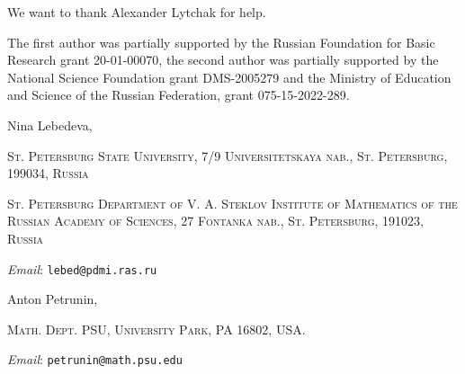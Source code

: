 \documentclass{article}
\makeatletter
\newcommand{\Addresses}{{\bigskip\footnotesize

\noindent Nina Lebedeva,
\par\nopagebreak
 \textsc{St. Petersburg State University, 7/9 Universitetskaya nab., St. Petersburg, 199034, Russia}
\par
\nopagebreak
 \textsc{St. Petersburg Department of V. A. Steklov Institute of Mathematics of the Russian Academy of Sciences, 27 Fontanka nab., St. Petersburg, 191023, Russia}
  \par\nopagebreak
  \textit{Email}: \texttt{lebed@pdmi.ras.ru}

\medskip

\noindent   Anton Petrunin, 
\par\nopagebreak
 \textsc{Math. Dept. PSU, University Park, PA 16802, USA.}
  \par\nopagebreak
  \textit{Email}: \texttt{petrunin@math.psu.edu}
  
}}
\makeatother
\begin{document}
We want to thank Alexander Lytchak for help. 

The first author was partially supported by the Russian Foundation for Basic Research grant 20-01-00070, the second author was partially supported by the National Science Foundation grant DMS-2005279
and the Ministry of Education and Science of the Russian Federation, grant 075-15-2022-289.

{\sloppy
\printbibliography[heading=bibintoc]
\fussy
}

\Addresses
\end{document}

